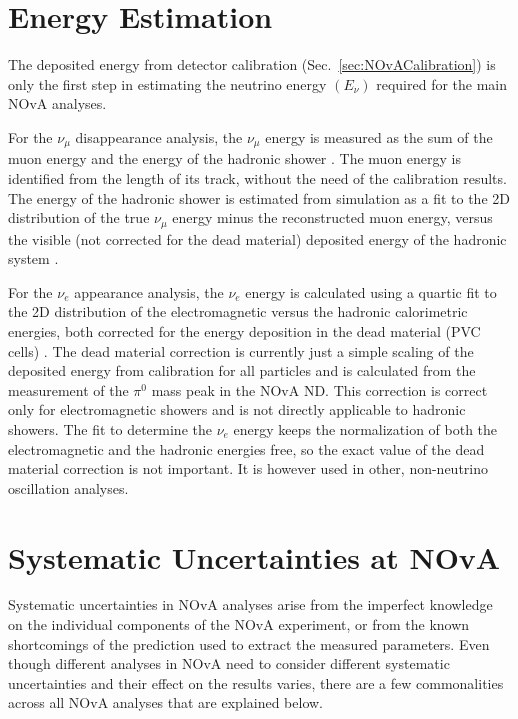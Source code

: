 \section{Energy Estimation}\label{sec:NOvAEnergyEstimation}
The deposited energy from detector calibration (Sec.~\ref{sec:NOvACalibration}) is only the first step in estimating the neutrino energy $\left(E_\nu\right)$ required for the main \gls{NOvA} analyses.

For the $\nu_\mu$ disappearance analysis, the $\nu_\mu$ energy is measured as the sum of the muon energy and the energy of the hadronic shower \cite{NOvAResults2021.pdf}. The muon energy is identified from the length of its track, without the need of the calibration results. The energy of the hadronic shower is estimated from simulation as a fit to the 2D distribution of the true $\nu_\mu$ energy minus the reconstructed muon energy, versus the visible (not corrected for the dead material) deposited energy of the hadronic system \cite{PsihasNOvAThesis_ProngCVN.pdf}.

For the $\nu_e$ appearance analysis, the $\nu_e$ energy is calculated using a quartic fit to the 2D distribution of the electromagnetic versus the hadronic calorimetric energies, both corrected for the energy deposition in the dead material (\gls{PVC} cells) \cite{PsihasNOvAThesis_ProngCVN.pdf}. The dead material correction is currently just a simple scaling of the deposited energy from calibration for all particles and is calculated from the measurement of the $\pi^0$ mass peak in the \gls{NOvA} \gls{ND}. This correction is correct only for electromagnetic showers and is not directly applicable to hadronic showers. The fit to determine the $\nu_e$ energy keeps the normalization of both the electromagnetic and the hadronic energies free, so the exact value of the dead material correction is not important. It is however used in other, non-neutrino oscillation analyses.

\section{Systematic Uncertainties at NOvA}\label{sec:NOvASystematics}

Systematic uncertainties in \gls{NOvA} analyses arise from the imperfect knowledge on the individual components of the \gls{NOvA} experiment, or from the known shortcomings of the prediction used to extract the measured parameters. Even though different analyses in \gls{NOvA} need to consider different systematic uncertainties and their effect on the results varies, there are a few commonalities across all \gls{NOvA} analyses that are explained below.

